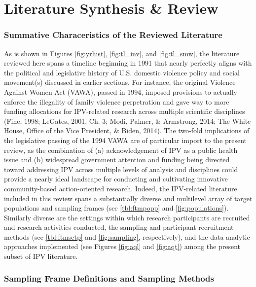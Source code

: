 \documentclass[11pt,]{tufte-book}
\begin{document}
\part{Literature Synthesis \& Review}

\section{Summative Characeristics of the Reviewed
Literature}\label{summative-characeristics-of-the-reviewed-literature}

As is shown in Figures \ref{fig:yrhist}, \ref{fig:tl_inv}, and
\ref{fig:tl_smw}, the literature reviewed here spans a timeline
beginning in 1991 that nearly perfectly aligns with the political and
legislative history of U.S. domestic violence policy and social
movement(s) discussed in earlier sections. For instance, the original
Violence Against Women Act (VAWA), passed in 1994, imposed provisions to
actually enforce the illegality of family violence perpetration and gave
way to more funding allocations for IPV-related research across multiple
scientific disciplines (Fine, 1998; LeGates, 2001, Ch. 3; Modi, Palmer,
\& Armstrong, 2014; The White House, Office of the Vice President, \&
Biden, 2014). The two-fold implications of the legislative passing of
the 1994 VAWA are of particular import to the present review, as the
combination of (a) acknowledgement of IPV as a public health issue and
(b) widespread government attention and funding being directed toward
addressing IPV across multiple levels of analysis and disciplines could
provide a nearly ideal landscape for conducting and cultivating
innovative community-based action-oriented research. Indeed, the
IPV-related literature included in this review spans a substantially
diverse and multilevel array of target populations and sampling frames
(see \cref{tbl:ftmpopp} and
\cref{fig:populations}). Similarly diverse are the
settings within which research participants are recruited and research
activities conducted, the sampling and participant recruitment methods
(see \cref{tbl:ftmsetp} and
\cref{fig:sampling}, respectively), and the data
analytic approaches implemented (see Figures \ref{fig:aql} and
\ref{fig:aqt}) among the present subset of IPV literature.

\section{Sampling Frame Definitions and Sampling
Methods}\label{sampling-frame-definitions-and-sampling-methods}
\end{document}
